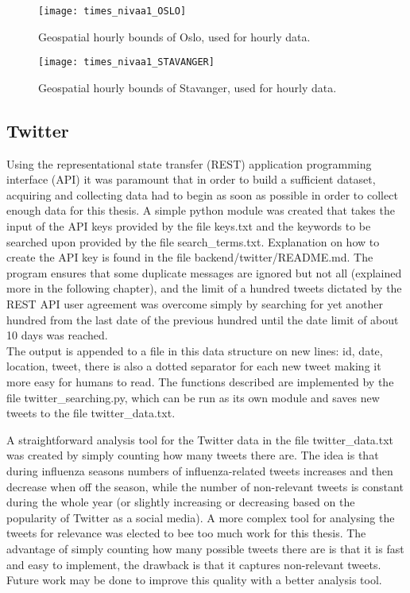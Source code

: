 \begin{figure}[!htb]
\texttt{[image: times\_nivaa1\_OSLO]}
\centering
\caption{Geospatial hourly bounds of Oslo, used for hourly data.}
\label{fig:hboundsoslo}
\end{figure}

\begin{figure}[!htb]
\texttt{[image: times\_nivaa1\_STAVANGER]}
\centering
\caption{Geospatial hourly bounds of Stavanger, used for hourly data.}
\label{fig:hboundsstavanger}
\end{figure}


\newpage



\subsection{Twitter}
Using the representational state transfer (REST) application programming interface (API) it was paramount that in order to build a sufficient dataset, acquiring and collecting data had to begin as soon as possible in order to collect enough data for this thesis. A simple python module was created that takes the input of the API keys provided by the file keys.txt and the keywords to be searched upon provided by the file search\_terms.txt. Explanation on how to create the API key is found in the file backend/twitter/README.md. The program ensures that some duplicate messages are ignored but not all (explained more in the following chapter), and the limit of a hundred tweets dictated by the REST API user agreement was overcome simply by searching for yet another hundred from the last date of the previous hundred until the date limit of about 10 days was reached.\\
The output is appended to a file in this data structure on new lines: id, date, location, tweet, there is also a dotted separator for each new tweet making it more easy for humans to read. The functions described are implemented by the file twitter\_searching.py, which can be run as its own module and saves new tweets to the file twitter\_data.txt.

A straightforward analysis tool for the Twitter data in the file twitter\_data.txt was created by simply counting how many tweets there are. The idea is that during influenza seasons numbers of influenza-related tweets increases and then decrease when off the season, while the number of non-relevant tweets is constant during the whole year (or slightly increasing or decreasing based on the popularity of Twitter as a social media). A more complex tool for analysing the tweets for relevance was elected to bee too much work for this thesis. The advantage of simply counting how many possible tweets there are is that it is fast and easy to implement, the drawback is that it captures non-relevant tweets. Future work may be done to improve this quality with a better analysis tool. 

